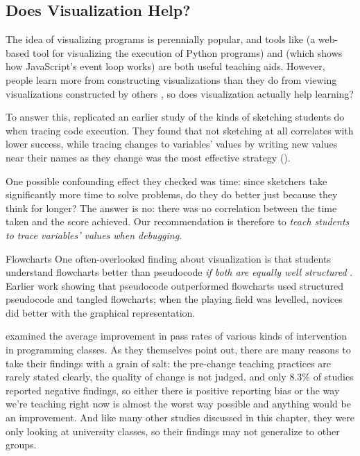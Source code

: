 \subsection*{Does Visualization Help?}

The idea of visualizing programs is perennially popular, and tools
like \cite{Guo2013} (a web-based tool for visualizing the
execution of Python programs) and  (which shows how
JavaScript's event loop works) are both useful teaching aids.
However, people learn more from constructing visualizations than they
do from viewing visualizations constructed by others
\cite{Stas1998,Ceti2016}, so does visualization actually
help learning?

To answer this, \cite{Cunn2017} replicated an earlier study of the
kinds of sketching students do when tracing code execution. They found
that not sketching at all correlates with lower success, while tracing
changes to variables' values by writing new values near their names as
they change was the most effective strategy ().

One possible confounding effect they checked was time: since sketchers
take significantly more time to solve problems, do they do better just
because they think for longer? The answer is no: there was no
correlation between the time taken and the score achieved. Our
recommendation is therefore to \emph{teach students to trace variables'
values when debugging}.

\begin{aside}{Flowcharts}
  One often-overlooked finding about visualization is that students
  understand flowcharts better than pseudocode \emph{if both are equally well
    structured} \cite{Scan1989}. Earlier work showing that pseudocode
  outperformed flowcharts used structured pseudocode and tangled
  flowcharts; when the playing field was levelled, novices did better
  with the graphical representation.
\end{aside}


\cite{Viha2014} examined the average improvement in pass rates of
various kinds of intervention in programming classes. As they themselves
point out, there are many reasons to take their findings with a grain of
salt: the pre-change teaching practices are rarely stated clearly, the
quality of change is not judged, and only 8.3\% of studies reported
negative findings, so either there is positive reporting bias or the way
we're teaching right now is almost the worst way possible and anything
would be an improvement. And like many other studies discussed in this
chapter, they were only looking at university classes, so their findings
may not generalize to other groups.


